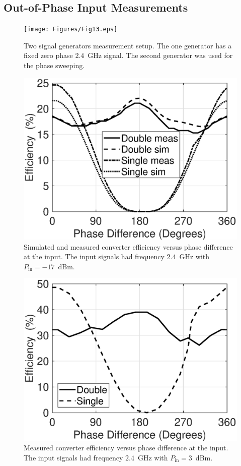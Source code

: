 \documentclass[journal]{IEEEtran}
\begin{document}
\subsection{Out-of-Phase Input Measurements} 
\label{subsec:outof}

\begin{figure}[!t]
\centering
\texttt{[image: Figures/Fig13.eps]}
\caption{Two signal generators measurement setup. The one  generator has a fixed  zero phase $2.4$~GHz signal. The second generator was used for the phase sweeping.}
\label{fig:setup}
\end{figure}
%
\begin{figure}[!t]
\centering
\includegraphics[width=0.9\columnwidth]{Figures/Fig14.eps}
\caption{Simulated and measured converter efficiency 
 versus phase difference at the input. 
 The  input signals had frequency $2.4$~GHz  with $P_\text{in}=-17$~dBm.}
\label{fig:eff_vs_phase_min17}
\end{figure}
%
\begin{figure}[t]
\centering
\includegraphics[width=0.9\columnwidth]{Figures/Fig15.eps}
\caption{Measured converter efficiency versus phase difference at the input.  The  input signals had frequency $2.4$~GHz  with $P_\text{in}=3$~dBm.}
\label{fig:eff_vs_phase_3}
\end{figure}
%
\end{document}
